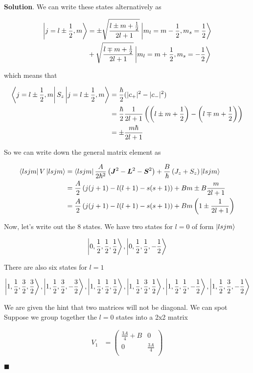 \documentclass[12pt]{article}
\theoremstyle{definition}
\newenvironment{s}{%
        \begin{trivlist} \item \textbf{Solution}. }{%
            \hspace*{\fill} $\blacksquare$\end{trivlist}}%
\begin{document}
{\begin{s}
We can write these states alternatively as

\begin{align*}
\ket{j=l\pm \frac{1}{2},m} &= \pm\sqrt{\frac{l\pm m +\frac{1}{2}}{2l+1}}\ket{m_{l} = m-\frac{1}{2}, m_{s}=\frac{1}{2}} \\
&+ \sqrt{\frac{l\mp m +\frac{1}{2}}{2l+1}}\ket{m_{l} = m+\frac{1}{2}, m_{s}=-\frac{1}{2}}
\end{align*} 

which means that

\begin{align*}
\bra{j=l\pm \frac{1}{2},m}S_{z}\ket{j=l\pm \frac{1}{2},m} &= \frac{\hbar}{2}(|c_{+}|^{2}-|c_{-}|^{2})\\
&= \frac{\hbar}{2}\frac{1}{2l+1}\left(\left(l\pm m+\frac{1}{2}\right)-\left(l\mp m+\frac{1}{2}\right)\right) \\
&= \pm \frac{m\hbar}{2l+1}
\end{align*} 

So we can write down the general matrix element as

\begin{align*}
\bra{lsjm}V\ket{lsjm} &= \bra{lsjm}\frac{A}{2\hbar^{2}}\left(\bm{J}^{2}-\bm{L}^{2}-\bm{S}^{2}\right) + \frac{B}{\hbar}\left(J_z + S_z\right)\ket{lsjm}\\
&= \frac{A}{2}\left(j(j+1)-l(l+1)-s(s+1)\right) + Bm \pm B\frac{m}{2l+1}\\
&= \frac{A}{2}\left(j(j+1)-l(l+1)-s(s+1)\right) + Bm\left(1 \pm \frac{1}{2l+1}\right)\\
\end{align*} 

Now, let's write out the 8 states. We have two states for $l=0$ of form $\ket{lsjm}$

\begin{align*}
\ket{0, \frac{1}{2}, \frac{1}{2}, \frac{1}{2}},
\ket{0, \frac{1}{2}, \frac{1}{2}, -\frac{1}{2}}
\end{align*} 

There are also six states for $l=1$ 

\begin{align*}
\ket{1, \frac{1}{2}, \frac{3}{2}, \frac{3}{2}},
\ket{1, \frac{1}{2}, \frac{3}{2}, -\frac{3}{2}},
\ket{1, \frac{1}{2}, \frac{1}{2}, \frac{1}{2}},
\ket{1, \frac{1}{2}, \frac{3}{2}, \frac{1}{2}},
\ket{1, \frac{1}{2}, \frac{1}{2}, -\frac{1}{2}},
\ket{1, \frac{1}{2}, \frac{3}{2}, -\frac{1}{2}}
\end{align*} 

We are given the hint that two matrices will not be diagonal. We can spot Suppose we group together the $l=0$ states into a 2x2 matrix

\begin{align*}
V_{1} &= \begin{pmatrix}
\frac{3A}{4} + B& 0\\
0 & \frac{3A}{4}\\
\end{pmatrix}
\end{align*}

\end{s}
\end{document}
